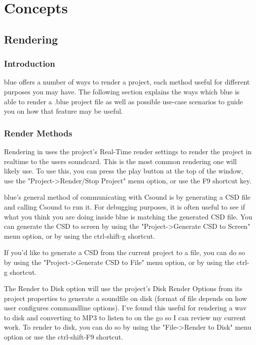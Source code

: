 \chapter{Concepts}\label{concepts}

\section{Rendering}\label{rendering}

\subsection{Introduction}

blue offers a number of ways to render a project, each method useful for
different purposes you may have. The following section explains the ways
which blue is able to render a .blue project file as well as possible
use-case scenarios to guide you on how that feature may be useful.

\subsection{Render Methods}

Rendering in uses the project's Real-Time render settings to render the
project in realtime to the users soundcard. This is the most common
rendering one will likely use. To use this, you can press the play
button at the top of the window, use the
"Project-\textgreater{}Render/Stop Project" menu option, or use the F9
shortcut key.

blue's general method of communicating with Csound is by generating a
CSD file and calling Csound to run it. For debugging purposes, it is
often useful to see if what you think you are doing inside blue is
matching the generated CSD file. You can generate the CSD to screen by
using the "Project-\textgreater{}Generate CSD to Screen" menu option, or
by using the ctrl-shift-g shortcut.

If you'd like to generate a CSD from the current project to a file, you
can do so by using the "Project-\textgreater{}Generate CSD to File" menu
option, or by using the ctrl-g shortcut.

The Render to Disk option will use the project's Disk Render Options
from its project properties to generate a soundfile on disk (format of
file depends on how user configures commandline options). I've found
this useful for rendering a wav to disk and converting to MP3 to listen
to on the go so I can review my current work. To render to disk, you can
do so by using the "File-\textgreater{}Render to Disk" menu option or
use the ctrl-shift-F9 shortcut.


